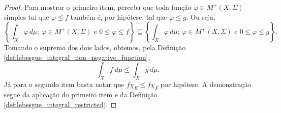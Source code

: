 \begin{proof}
    Para mostrar o primeiro item, perceba que toda função $\varphi \in M^{+}(X,\Sigma)$ simples tal que $\varphi \leq f$ também é, por hipótese, tal que $\varphi \leq g$. Ou seja,
    \begin{equation*}
        \left\{ \int_X \varphi \, d\mu; \ \varphi \in  M^{+}(X,\Sigma) \text{ e } 0 \leq \varphi \leq f \right\} \subseteq \left\{ \int_X \varphi \, d\mu; \ \varphi \in  M^{+}(X,\Sigma) \text{ e } 0 \leq \varphi \leq g \right\}.
    \end{equation*}
    Tomando o supremo dos dois lados, obtemos, pela Definição \ref{def:lebesgue_integral_non_negative_function},
    \begin{equation*}
        \int_{X} f \ d\mu \leq \int_{X} g \ d\mu.
    \end{equation*}
    Já para o segundo item basta notar que $f\chi_E\leq f\chi_F$ por hipótese. A demonstração segue da aplicação do primeiro item e da Definição \ref{def:lebesgue_integral_restricted}.
\end{proof}